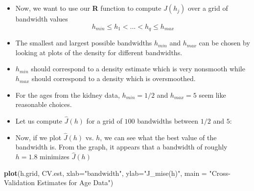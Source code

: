 \documentclass[]{book}
\newenvironment{Shaded}{\begin{snugshade}}{\end{snugshade}}
\newcommand{\ControlFlowTok}[1]{\textcolor[rgb]{0.13,0.29,0.53}{\textbf{#1}}}
\newcommand{\DataTypeTok}[1]{\textcolor[rgb]{0.13,0.29,0.53}{#1}}
\newcommand{\DecValTok}[1]{\textcolor[rgb]{0.00,0.00,0.81}{#1}}
\newcommand{\KeywordTok}[1]{\textcolor[rgb]{0.13,0.29,0.53}{\textbf{#1}}}
\newcommand{\NormalTok}[1]{#1}
\newcommand{\OperatorTok}[1]{\textcolor[rgb]{0.81,0.36,0.00}{\textbf{#1}}}
\newcommand{\StringTok}[1]{\textcolor[rgb]{0.31,0.60,0.02}{#1}}
\providecommand{\tightlist}{%
  \setlength{\itemsep}{0pt}\setlength{\parskip}{0pt}}
\begin{document}
\begin{itemize}
\item
  Now, we want to use our \textbf{R} function to compute \(\hat{J}(h_{j})\) over
  a grid of bandwidth values
  \begin{equation}
  h_{min} \leq h_{1} < ... < h_{q} \leq h_{max} \nonumber
  \end{equation}
\item
  The smallest and largest possible bandwidths \(h_{min}\) and \(h_{max}\) can be chosen
  by looking at plots of the density for different bandwidths.
\item
  \(h_{min}\) should correspond
  to a density estimate which is very nonsmooth while \(h_{max}\) should correspond to
  a density which is oversmoothed.
\item
  For the ages from the kidney data, \(h_{min} = 1/2\) and \(h_{max} = 5\) seem like reasonable choices.
\item
  Let us compute \(\hat{J}(h)\) for a grid of \(100\) bandwidths between \(1/2\) and \(5\):
\end{itemize}

\begin{Shaded}
\end{Shaded}

\begin{itemize}
\tightlist
\item
  Now, if we plot \(\hat{J}(h)\) vs. \(h\), we can see what the best value of the bandwidth is.
  From the graph, it appears that a bandwidth of roughly \(h = 1.8\) minimizes \(\hat{J}(h)\)
\end{itemize}

\begin{Shaded}
\begin{Highlighting}[]
\KeywordTok{plot}\NormalTok{(h.grid, CV.est, }\DataTypeTok{xlab=}\StringTok{"bandwidth"}\NormalTok{, }\DataTypeTok{ylab=}\StringTok{"J_mise(h)"}\NormalTok{, }
     \DataTypeTok{main =} \StringTok{"Cross-Validation Estimates for Age Data"}\NormalTok{)}
\end{Highlighting}
\end{Shaded}
\end{document}
